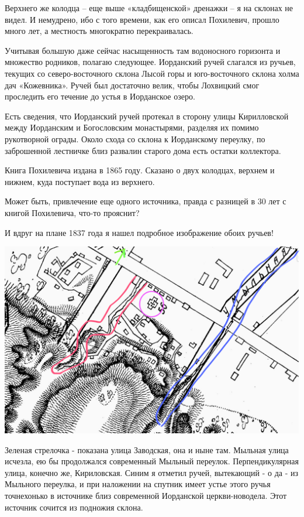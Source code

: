 Верхнего же колодца – еще выше «кладбищенской» дренажки – я на склонах не видел. И немудрено, ибо с того времени, как его описал Похилевич, прошло много лет, а местность многократно перекраивалась.

Учитывая большую даже сейчас насыщенность там водоносного горизонта и множество родников, полагаю следующее. Иорданский ручей слагался из ручьев, текущих со северо-восточного склона Лысой горы и юго-восточного склона холма дач «Кожевника». Ручей был достаточно велик, чтобы Лохвицкий смог проследить его течение до устья в Иорданское озеро. 

Есть сведения, что Иорданский ручей протекал в сторону улицы Кирилловской между Иорданским и Богословским монастырями, разделяя их помимо рукотворной ограды. Около схода со склона к Иорданскому переулку, по заброшенной лестничке близ развалин старого дома есть остатки коллектора. 

Книга Похилевича издана в 1865 году. Сказано о двух колодцах, верхнем и нижнем, куда поступает вода из верхнего.

Может быть, привлечение еще одного источника, правда с разницей в 30 лет с книгой Похилевича, что-то прояснит?


И вдруг на плане 1837 года я нашел подробное изображение обоих ручьев!

\begin{center}
\includegraphics[width=\linewidth]{chast-kirvys/iordanruch/map.png}
\end{center}

Зеленая стрелочка - показана улица Заводская, она и ныне там. Мыльная улица исчезла, ею бы продолжался современный Мыльный переулок. Перпендикулярная улица, конечно же, Кириловская. Синим я отметил ручей, вытекающий - о да - из Мыльного переулка, и при наложении на спутник имеет устье этого ручья точнехонько в источнике близ современной Иорданской церкви-новодела. Этот источник сочится из подножия склона.

